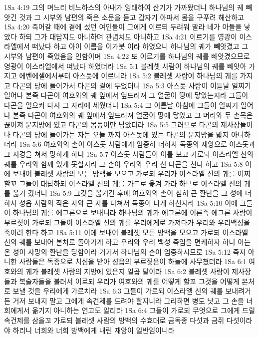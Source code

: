 1Sa 4:19  그의 며느리 비느하스의 아내가 잉태하여 산기가 가까왔더니 하나님의 궤 빼앗긴 것과 그 시부와 남편의 죽은 소문을 듣고 갑자기 아파서 몸을 구푸려 해산하고
1Sa 4:20  죽어갈 때에 곁에 섰던 여인들이 그에게 이르되 두려워 말라 네가 아들을 낳았다 하되 그가 대답지도 아니하며 관념치도 아니하고
1Sa 4:21  이르기를 영광이 이스라엘에서 떠났다 하고 아이 이름을 이가봇 이라 하였으니 하나님의 궤가 빼앗겼고 그 시부와 남편이 죽었음을 인함이며
1Sa 4:22  또 이르기를 하나님의 궤를 빼앗겼으므로 영광이 이스라엘에서 떠났다 하였더라
1Sa 5:1  블레셋 사람이 하나님의 궤를 빼앗아 가지고 에벤에셀에서부터 아스돗에 이르니라
1Sa 5:2  블레셋 사람이 하나님의 궤를 가지고 다곤의 당에 들어가서 다곤의 곁에 두었더니
1Sa 5:3  아스돗 사람이 이튿날 일찌기 일어나 본즉 다곤이 여호와의 궤 앞에서 엎드러져 그 얼굴이 땅에 닿았는지라 그들이 다곤을 일으켜 다시 그 자리에 세웠더니
1Sa 5:4  그 이튿날 아침에 그들이 일찌기 일어나 본즉 다곤이 여호와의 궤 앞에서 엎드러져 얼굴이 땅에 닿았고 그 머리와 두 손목은 끊어져 문지방에 있고 다곤의 몸둥이만 남았더라
1Sa 5:5  그러므로 다곤의 제사장들이나 다곤의 당에 들어가는 자는 오늘 까지 아스돗에 있는 다곤의 문지방을 밟지 아니하더라
1Sa 5:6  여호와의 손이 아스돗 사람에게 엄중히 더하사 독종의 재앙으로 아스돗과 그 지경을 쳐서 망하게 하니
1Sa 5:7  아스돗 사람들이 이를 보고 가로되 이스라엘 신의 궤를 우리와 함께 있게 못할지라 그 손이 우리와 우리 신 다곤을 친다 하고
1Sa 5:8  이에 보내어 블레셋 사람의 모든 방백을 모으고 가로되 우리가 이스라엘 신의 궤를 어찌할꼬 그들이 대답하되 이스라엘 신의 궤를 가드로 옮겨 가라 하므로 이스라엘 신의 궤를 옮겨 갔더니
1Sa 5:9  그것을 옮겨간 후에 여호와의 손이 심히 큰 환난을 그 성에 더하사 성읍 사람의 작은 자와 큰 자를 다쳐서 독종이 나게 하신지라
1Sa 5:10  이에 그들이 하나님의 궤를 에그론으로 보내니라 하나님의 궤가 에그론에 이른즉 에그론 사람이 부르짖어 가로되 그들이 이스라엘 신의 궤를 우리에게로 가져다가 우리와 우리백성을 죽이려 한다 하고
1Sa 5:11  이에 보내어 블레셋 모든 방백을 모으고 가로되 이스라엘 신의 궤를 보내어 본처로 돌아가게 하고 우리와 우리 백성 죽임을 면케하자 하니 이는 온 성이 사망의 환난을 당함이라 거기서 하나님의 손이 엄중하시므로
1Sa 5:12  죽지 아니한 사람들은 독종으로 치심을 받아 성읍의 부르짖음이 하늘에 사무쳤더라
1Sa 6:1  여호와의 궤가 블레셋 사람의 지방에 있은지 일곱 달이라
1Sa 6:2  블레셋 사람이 제사장들과 복술자들을 불러서 이르되 우리가 여호와의 궤를 어떻게 할꼬 그것을 어떻게 본처로 보낼 것을 우리에게 가르치라
1Sa 6:3  그들이 가로되 이스라엘 신의 궤를 보내려거든 거저 보내지 말고 그에게 속건제를 드려야 할지니라 그리하면 병도 낫고 그 손을 너희에게서 옮기지 아니하는 연고도 알리라
1Sa 6:4  그들이 가로되 무엇으로 그에게 드릴 속건제를 삼을꼬 가로되 블레셋 사람의 방백의 수효대로 금독종 다섯과 금쥐 다섯이라야 하리니 너희와 너희 방백에게 내린 재앙이 일반임이니라
